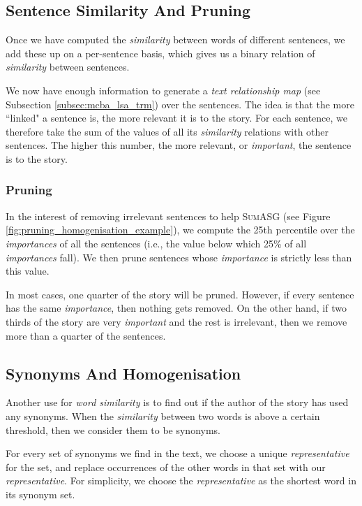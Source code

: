 \subsection{Sentence Similarity And Pruning}

Once we have computed the \textit{similarity} between words of different sentences, we add these up on a per-sentence basis, which gives us a binary relation of \textit{similarity} between sentences.

We now have enough information to generate a \textit{text relationship map} (see Subsection \ref{subsec:mcba_lsa_trm}) over the sentences. The idea is that the more ``linked" a sentence is, the more relevant it is to the story. For each sentence, we therefore take the sum of the values of all its \textit{similarity} relations with other sentences. The higher this number, the more relevant, or \textit{important}, the sentence is to the story.

\subsubsection*{Pruning}

In the interest of removing irrelevant sentences to help \textsc{SumASG} (see Figure \ref{fig:pruning_homogenisation_example}), we compute the 25th percentile over the \textit{importances} of all the sentences (i.e., the value below which 25\% of all \textit{importances} fall). We then prune sentences whose \textit{importance} is strictly less than this value.

In most cases, one quarter of the story will be pruned. However, if every sentence has the same \textit{importance}, then nothing gets removed. On the other hand, if two thirds of the story are very \textit{important} and the rest is irrelevant, then we remove more than a quarter of the sentences.

\subsection{Synonyms And Homogenisation}

Another use for \textit{word similarity} is to find out if the author of the story has used any synonyms. When the \textit{similarity} between two words is above a certain threshold, then we consider them to be synonyms.

For every set of synonyms we find in the text, we choose a unique \textit{representative} for the set, and replace occurrences of the other words in that set with our \textit{representative}. For simplicity, we choose the \textit{representative} as the shortest word in its synonym set.

